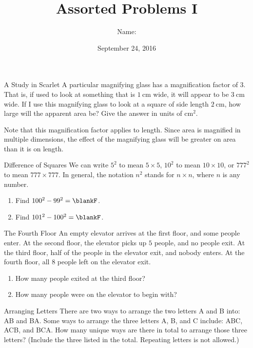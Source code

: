 \documentclass[14pt,letterpaper]{article}
\title{Assorted Problems I}
\author{Name: \underline{\hspace{5cm}}}
\date{September 24, 2016}
\begin{document}
\HomeworkTitle

\thispagestyle{empty}

\begin{problem}{A Study in Scarlet}
 A particular magnifying glass has a magnification factor of $3$. That is, if
 used to look at something that is $\SI{1}{\centi\metre}$ wide, it will appear
 to be $\SI{3}{\centi\metre}$ wide. If I use this magnifying glass to look at a
 square of side length $\SI{2}{\centi\metre}$, how large will the apparent area
 be? Give the answer in units of $\si{\centi\metre\squared}$.

 Note that this magnification factor applies to length. Since area is magnified
 in multiple dimensions, the effect of the magnifying glass will be greater on
 area than it is on length.
\end{problem}

\begin{problem}{Difference of Squares}
 We can write $5^2$ to mean $5\times5$, $10^2$ to mean $10\times10$, or $777^2$
 to mean $777\times777$. In general, the notation $n^2$ stands for $n\times n$,
 where $n$ is any number.

 \begin{enumerate}[\hspace{1cm}a.]
  \item Find $100^2 - 99^2 = \blankF$.
  \item Find $101^2 - 100^2 = \blankF$.
 \end{enumerate}
\end{problem}

\begin{problem}{The Fourth Floor}
 An empty elevator arrives at the first floor, and some people enter. At the
 second floor, the elevator picks up $5$ people, and no people exit. At the
 third floor, half of the people in the elevator exit, and nobody enters. At the
 fourth floor, all $8$ people left on the elevator exit.

 \begin{enumerate}[\hspace{1cm}a.]
  \item How many people exited at the third floor? \hfill \blankF
  \item How many people were on the elevator to begin with? \hfill \blankF
 \end{enumerate}
\end{problem}

\begin{problem}{Arranging Letters}
 There are two ways to arrange the two letters A and B into: AB and BA. Some
 ways to arrange the three letters A, B, and C include: ABC, ACB, and BCA. How
 many unique ways are there in total to arrange those three letters? (Include
 the three listed in the total. Repeating letters is not allowed.)
\end{problem}
\end{document}
